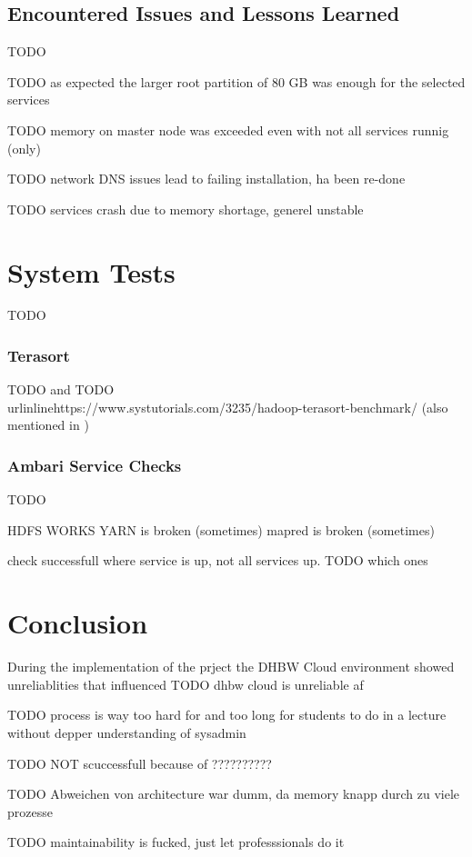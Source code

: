\subsection{Encountered Issues and Lessons Learned}
TODO

TODO as expected the larger root partition of 80 GB was enough for the selected services

TODO memory on master node was exceeded even with not all services runnig (only)

TODO network DNS issues lead to failing installation, ha been re-done

TODO services crash due to memory shortage, generel unstable


\section{System Tests}

TODO

\subsubsection{Terasort}

TODO and \autocite{omally2008terasort}
TODO \\urlinline{https://www.systutorials.com/3235/hadoop-terasort-benchmark/} (also mentioned in \autocite[][]{white2015hadoop})

\subsubsection{Ambari Service Checks}

TODO

HDFS WORKS
YARN is broken (sometimes)
mapred is broken (sometimes)

check successfull where service is up, not all services up. TODO which ones

\section{Conclusion}



During the implementation of the prject the \ac{DHBW} Cloud environment showed unreliablities that influenced
TODO dhbw cloud is unreliable af

TODO process is way too hard for and too long for students to do in a lecture without depper understanding of sysadmin  

TODO NOT scuccessfull because of ??????????

TODO Abweichen von architecture war dumm, da memory knapp durch zu viele prozesse

TODO maintainability is fucked, just let professsionals do it










